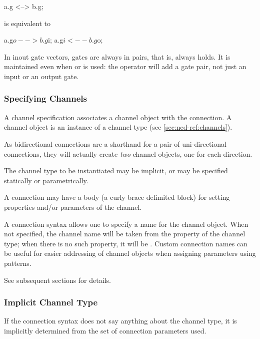 \begin{ned}
a.g <--> b.g;
\end{ned}

is equivalent to
\begin{ned}
a.g$o --> b.g$i;
a.g$i <-- b.g$o;
\end{ned}

In inout gate vectors, gates are always in pairs, that is,
 always holds. It is maintained even
when  or  is used: the \ttt{++} operator will
add a gate pair, not just an input or an output gate.


\subsubsection{Specifying Channels}
\label{sec:ned-ref:specifying-channels}

A channel specification associates a channel object with the connection.
A channel object is an instance of a channel type (see \ref{sec:ned-ref:channels}).

\begin{note}
As bidirectional connections are a shorthand for a pair of uni-directional
connections, they will actually create \textit{two} channel objects, one
for each direction.
\end{note}

The channel type to be instantiated may be implicit, or may be specified
statically or parametrically.

A connection may have a body (a curly brace delimited block) for setting
properties and/or parameters of the channel.

A connection syntax allows one to specify a name for the channel object.
When not specified, the channel name will be taken from the 
property of the channel type; when there is no such property, it will be
. Custom connection names can be useful for easier addressing of
channel objects when assigning parameters using patterns.

See subsequent sections for details.


\subsubsection{Implicit Channel Type}
\label{sec:ned-ref:implicit-channel-type}

If the connection syntax does not say anything about the channel type, it
is implicitly determined from the set of connection parameters used.

